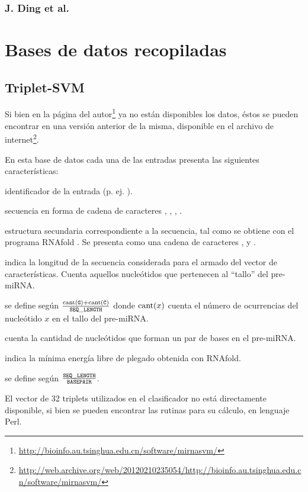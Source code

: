 \documentclass[12pt,bibliography=oldstyle,DIV=12,parskip=half-,titlepage]{scrartcl}
\begin{document}
\subsubsection*{J. Ding et al. \cite{ding}}
%
%
%
%
\section{Bases de datos recopiladas}
%
\subsection{Triplet-SVM \cite{xue}}
%
Si bien en la página del
autor\footnote{\url{http://bioinfo.au.tsinghua.edu.cn/software/mirnasvm/}}
ya no están disponibles los datos, éstos se pueden encontrar en una
versión anterior de la misma, disponible en el archivo de
internet\footnote{\url{http://web.archive.org/web/20120210235054/http://bioinfo.au.tsinghua.edu.cn/software/mirnasvm/}}.

En esta base de datos cada una de las entradas presenta las siguientes
características:
\begin{description*}
%
\item[identificador] de la entrada (p. ej. ).
%
\item[secuencia] en forma de cadena de caracteres , ,
  , .
%
\item[estructura secundaria] correspondiente a la secuencia, tal como
  se obtiene con el programa RNAfold \cite{vienna}. Se presenta como
  una cadena de caracteres \mono{(},  y \mono{)}.
%
\item[\mono{SEQ\_LENGTH}] indica la longitud de la secuencia
  considerada para el armado del vector de características. Cuenta
  aquellos nucleótidos que pertenecen al ``tallo'' del pre-miRNA.
%
\item[\mono{GC\_CONTENT}] se define según
  $\frac{\textrm{cant}({\tt G})+\textrm{cant}({\tt C})}{{\tt SEQ\_LENGTH}}$
  donde $\textrm{cant}(x)$ cuenta el número de ocurrencias del nucleótido
  $x$ en el tallo del pre-miRNA.
%
\item[\mono{BASEPAIR}] cuenta la cantidad de nucleótidos
  que forman un par de bases en el pre-miRNA.
%
\item[\mono{FREE\_ENERGY}] indica la mínima energía libre de plegado
  obtenida con RNAfold.
%
\item[\mono{LEN\_BP\_RATIO}] se define según
  $\frac{{\tt SEQ\_LENGTH}}{{\tt BASEPAIR}}$.
\end{description*}
%
El vector de 32 triplets utilizados en el clasificador no está
directamente disponible, si bien se pueden encontrar las rutinas para su
cálculo, en lenguaje Perl.
%
\end{document}
